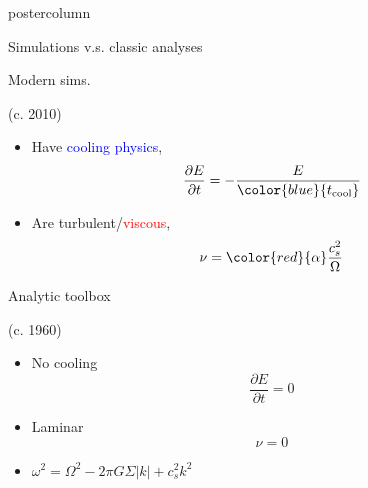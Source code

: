 \documentclass[final,hyperref={pdfpagelabels=false}]{beamer}
\newcommand{\p}{\partial}
\begin{document}
\begin{frame}
\begin{columns}
\begin{column}{.49\textwidth}
\begin{beamercolorbox}[center,wd=\textwidth]{postercolumn}
\begin{minipage}[T]{.95\textwidth}
{            \begin{block}{{\Large Simulations v.s. classic analyses}}
              \justifying
              \begin{minipage}[t]{0.49\linewidth}
                \centering \begin{onlinebox}{5cm}Modern sims.\end{onlinebox}
                  (c. 2010)
                  \begin{itemize}
                  \item Have \textcolor{blue}{cooling physics}, 
                    \[
                    \frac{\p E}{\p t} = - \frac{E}{\color{blue}{t_\mathrm{cool}}}
                    \]
                  \item Are turbulent/\textcolor{red}{viscous}, 
                    \[
                    \nu = {\color{red}{\alpha}}\frac{c_s^2}{\Omega}
                    \]
                  \end{itemize}
              \end{minipage}
              \begin{minipage}[t]{0.49\linewidth}
                \centering \begin{onlinebox}{6cm}Analytic toolbox\end{onlinebox}
                  (c. 1960) \\
                  \begin{itemize}
                  \item No cooling 
                    \[
                    \frac{\p E}{\p t} = 0
                    \]
                  \item Laminar 
                    \[
                    \nu = 0
                    \]
                  \item $\omega^2= \Omega^2 - 2\pi G \Sigma |k| +
                    c_s^2k^2 $
                  \end{itemize}
              \end{minipage}\\
              \vspace{1cm}
            
              
            \end{block}
            
}
\end{minipage}
\end{beamercolorbox}
\end{column}
\end{columns}
\end{frame}
\end{document}
